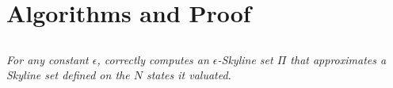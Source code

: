 \label{sec-appendix}

\vspace{2ex}

\section{Algorithms and Proof}

\subsection{\apxmodis}

{\em For any constant $\epsilon$, \apxmodis correctly computes an $\epsilon$-Skyline set $\Pi$ that approximates a Skyline set defined on the $N$ states it valuated. }

